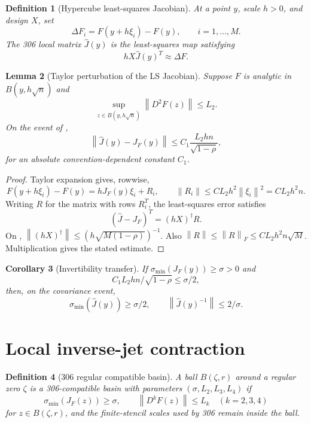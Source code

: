 \documentclass[11pt]{article}
\newtheorem{definition}{Definition}[section]
\newtheorem{lemma}[definition]{Lemma}
\newtheorem{corollary}[definition]{Corollary}
\newcommand{\norm}[1]{\left\lVert #1\right\rVert}
\begin{document}
\begin{definition}[Hypercube least-squares Jacobian]
At a point $y$, scale $h>0$, and design $X$, set
\[
        \Delta F_i=F(y+h\xi_i)-F(y),\qquad i=1,\ldots,M.
\]
The 306 local matrix $\widehat J(y)$ is the least-squares map satisfying
\[
        hX\widehat J(y)^T\approx \Delta F.
\]
\end{definition}

\begin{lemma}[Taylor perturbation of the LS Jacobian]\label{lem:ls-error}
Suppose $F$ is analytic in $B(y,h\sqrt n)$ and
\[
        \sup_{z\in B(y,h\sqrt n)}\norm{D^2F(z)}\le L_2.
\]
On the event of ,
\[
        \norm{\widehat J(y)-J_F(y)}
        \le C_1\frac{L_2 h n}{\sqrt{1-\rho}},
\]
for an absolute convention-dependent constant $C_1$.
\end{lemma}

\begin{proof}
Taylor expansion gives, rowwise,
\[
        F(y+h\xi_i)-F(y)=hJ_F(y)\xi_i+R_i,
        \qquad \norm{R_i}\le C L_2 h^2\norm{\xi_i}^2=C L_2 h^2 n.
\]
Writing $R$ for the matrix with rows $R_i^T$, the least-squares error satisfies
\[
        (\widehat J-J_F)^T=(hX)^\dagger R.
\]
On , $\norm{(hX)^\dagger}\le (h\sqrt{M(1-\rho)})^{-1}$.  Also $\norm R\le\norm R_F\le C L_2h^2n\sqrt M$.  Multiplication gives the stated estimate.
\end{proof}

\begin{corollary}[Invertibility transfer]\label{cor:invert}
If $\sigma_{\min}(J_F(y))\ge\sigma>0$ and
\[
        C_1L_2hn/\sqrt{1-\rho}\le\sigma/2,
\]
then, on the covariance event,
\[
        \sigma_{\min}(\widehat J(y))\ge\sigma/2,
        \qquad
        \norm{\widehat J(y)^{-1}}\le2/\sigma.
\]
\end{corollary}

\section{Local inverse-jet contraction}\label{sec:local}

\begin{definition}[306 regular compatible basin]
A ball $B(\zeta,r)$ around a regular zero $\zeta$ is a 306-compatible basin with parameters $(\sigma,L_2,L_3,L_4)$ if
\[
        \sigma_{\min}(J_F(z))\ge\sigma,
        \qquad
        \norm{D^kF(z)}\le L_k\quad(k=2,3,4)
\]
for $z\in B(\zeta,r)$, and the finite-stencil scales used by 306 remain inside the ball.
\end{definition}
\end{document}
